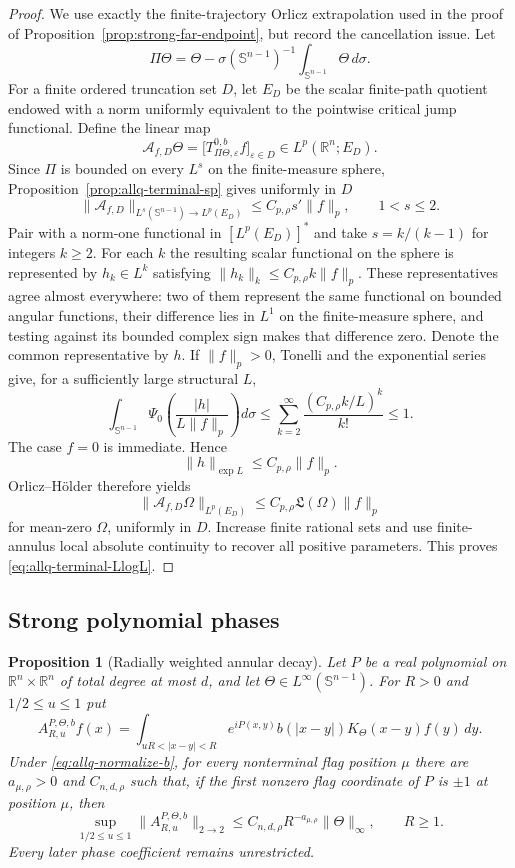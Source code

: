 \documentclass[11pt]{article}
\numberwithin{equation}{section}
\newtheorem{proposition}[theorem]{Proposition}
\theoremstyle{remark}
\theoremstyle{definition}
\newcommand{\R}{\mathbb R}
\newcommand{\Sph}{\mathbb S}
\begin{document}
\begin{proof}
We use exactly the finite-trajectory Orlicz extrapolation used in the proof
of Proposition~\ref{prop:strong-far-endpoint}, but record the cancellation
issue.
Let
\[
 \Pi\Theta=\Theta-\sigma(\Sph^{n-1})^{-1}\int_{\Sph^{n-1}}\Theta\,d\sigma.
\]
For a finite ordered truncation set $D$, let $E_D$ be the scalar
finite-path quotient endowed with a norm uniformly equivalent to the
pointwise critical jump functional.  Define the linear map
\[
 \mathcal A_{f,D}\Theta
 =\bigl[T^{0,b}_{\Pi\Theta,\varepsilon}f\bigr]_{\varepsilon\in D}
 \in L^p(\R^n;E_D).
\]
Since $\Pi$ is bounded on every $L^s$ on the finite-measure sphere,
Proposition~\ref{prop:allq-terminal-sp} gives uniformly in $D$
\[
 \|\mathcal A_{f,D}\|_{L^s(\Sph^{n-1})\to L^p(E_D)}
 \le C_{p,\rho}s'\|f\|_p,
 \qquad1<s\le2.
\]
Pair with a norm-one functional in $[L^p(E_D)]^*$ and take
$s=k/(k-1)$ for integers $k\ge2$.  For each $k$ the resulting scalar
functional on the sphere is represented by $h_k\in L^k$ satisfying
$\|h_k\|_k\le C_{p,\rho}k\|f\|_p$.  These representatives agree almost
everywhere: two of them represent the same functional on bounded angular
functions, their difference lies in $L^1$ on the finite-measure sphere,
and testing against its bounded complex sign makes that difference zero.
Denote the common representative by $h$.  If $\|f\|_p>0$, Tonelli and the
exponential series give, for a sufficiently large structural $L$,
\[
 \int_{\Sph^{n-1}}\Psi_0\left(\frac{|h|}{L\|f\|_p}\right)d\sigma
 \le\sum_{k=2}^\infty\frac{(C_{p,\rho}k/L)^k}{k!}\le1.
\]
The case $f=0$ is immediate.  Hence
\[
 \|h\|_{\exp L}\le C_{p,\rho}\|f\|_p.
\]
Orlicz--H\"older therefore yields
\[
 \|\mathcal A_{f,D}\Omega\|_{L^p(E_D)}
 \le C_{p,\rho}\mathfrak L(\Omega)\|f\|_p
\]
for mean-zero $\Omega$, uniformly in $D$.  Increase finite rational sets and
use finite-annulus local absolute continuity to recover all positive
parameters.  This proves \eqref{eq:allq-terminal-LlogL}.
\end{proof}

\subsection{Strong polynomial phases}

\begin{proposition}[Radially weighted annular decay]
\label{prop:allq-annular-decay}
Let $P$ be a real polynomial on $\R^n\times\R^n$ of total degree at most
$d$, and let $\Theta\in L^\infty(\Sph^{n-1})$.  For $R>0$ and
$1/2\le u\le1$ put
\[
 A^{P,\Theta,b}_{R,u}f(x)=
 \int_{uR<|x-y|<R}e^{iP(x,y)}b(|x-y|)
 K_\Theta(x-y)f(y)\,dy.
\]
Under \eqref{eq:allq-normalize-b}, for every nonterminal flag position
$\mu$ there are $a_{\mu,\rho}>0$ and $C_{n,d,\rho}$ such that, if the
first nonzero flag coordinate of $P$ is $\pm1$ at position $\mu$, then
\begin{equation}\label{eq:allq-annular-decay}
 \sup_{1/2\le u\le1}\|A^{P,\Theta,b}_{R,u}\|_{2\to2}
 \le C_{n,d,\rho}R^{-a_{\mu,\rho}}\|\Theta\|_\infty,
 \qquad R\ge1.
\end{equation}
Every later phase coefficient remains unrestricted.
\end{proposition}
\end{document}
